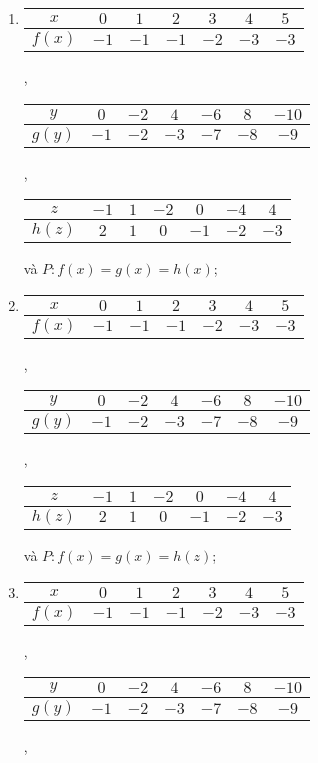 \documentclass[a4paper, titlepage, openany]{book}
\newcounter{exercise}
\begin{document}
\exercise[ex:hpt1]
\begin{enumerate}
   \item 
   \begin{tabular}{|c|c|c|c|c|c|c|}
      \hline
      $x$ & $0$ & $1$ & $2$ & $3$ & $4$ & $5$ \\
      \hline
      $f(x)$ & $-1$ & $-1$ & $-1$ & $-2$ & $-3$ & $-3$\\
      \hline
   \end{tabular},
   \begin{tabular}{|c|c|c|c|c|c|c|}
      \hline
      $y$ & $0$ & $-2$ & $4$ & $-6$ & $8$ & $-10$\\
      \hline
      $g(y)$ & $-1$ & $-2$ & $-3$ & $-7$ & $-8$ & $-9$\\
      \hline
   \end{tabular},

   \noindent\begin{tabular}{|c|c|c|c|c|c|c|}
      \hline
      $z$ & $-1$ & $1$ & $-2$ & $0$ & $-4$ & $4$\\
      \hline
      $h(z)$ & $2$ & $1$ & $0$ & $-1$ & $-2$ & $-3$\\
      \hline
   \end{tabular} và $P:f(x) = g(x) = h(x)$;

   \item
   \begin{tabular}{|c|c|c|c|c|c|c|}
      \hline
      $x$ & $0$ & $1$ & $2$ & $3$ & $4$ & $5$ \\
      \hline
      $f(x)$ & $-1$ & $-1$ & $-1$ & $-2$ & $-3$ & $-3$\\
      \hline
   \end{tabular},
   \begin{tabular}{|c|c|c|c|c|c|c|}
      \hline
      $y$ & $0$ & $-2$ & $4$ & $-6$ & $8$ & $-10$\\
      \hline
      $g(y)$ & $-1$ & $-2$ & $-3$ & $-7$ & $-8$ & $-9$\\
      \hline
   \end{tabular},

   \noindent\begin{tabular}{|c|c|c|c|c|c|c|}
      \hline
      $z$ & $-1$ & $1$ & $-2$ & $0$ & $-4$ & $4$\\
      \hline
      $h(z)$ & $2$ & $1$ & $0$ & $-1$ & $-2$ & $-3$\\
      \hline
   \end{tabular} và $P:f(x) = g(x) = h(z)$;

   \item
   \begin{tabular}{|c|c|c|c|c|c|c|}
      \hline
      $x$ & $0$ & $1$ & $2$ & $3$ & $4$ & $5$ \\
      \hline
      $f(x)$ & $-1$ & $-1$ & $-1$ & $-2$ & $-3$ & $-3$\\
      \hline
   \end{tabular},
   \begin{tabular}{|c|c|c|c|c|c|c|}
      \hline
      $y$ & $0$ & $-2$ & $4$ & $-6$ & $8$ & $-10$\\
      \hline
      $g(y)$ & $-1$ & $-2$ & $-3$ & $-7$ & $-8$ & $-9$\\
      \hline
   \end{tabular},


\end{enumerate}
\end{document}
